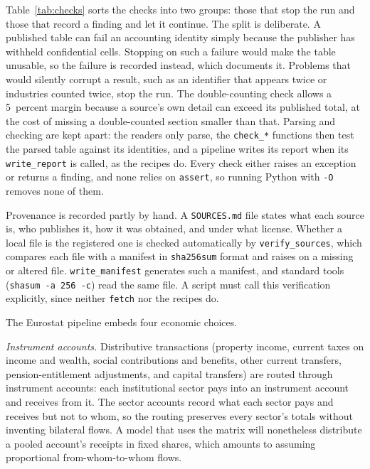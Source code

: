 \documentclass[11pt,a4paper]{article}
\begin{document}
Table~\ref{tab:checks} sorts the checks into two groups: those that stop
the run and those that record a finding and let it continue. The split is
deliberate. A published table can fail an accounting identity simply
because the publisher has withheld confidential cells. Stopping on such a
failure would make the table unusable, so the failure is recorded instead,
which documents it. Problems that would silently corrupt a result, such as
an identifier that appears twice or industries counted twice, stop the
run. The double-counting check allows a
5~percent margin because a source's own detail can exceed its published
total, at the cost of missing a double-counted section smaller than that.
Parsing and checking are kept apart: the readers only parse, the
\texttt{check\_*} functions then test the parsed table against its
identities, and a pipeline writes its report when its
\texttt{write\_report} is called, as the recipes do. Every check either
raises an exception or returns a finding, and none relies on
\texttt{assert}, so running Python with \texttt{-O} removes none of them.

Provenance is recorded partly by hand. A \texttt{SOURCES.md} file states
what each source is, who publishes it, how it was obtained, and under what
license. Whether a local file is the registered one is checked
automatically by \texttt{verify\_sources}, which compares each file with a
manifest in \texttt{sha256sum} format and raises on a missing or altered
file. \texttt{write\_manifest} generates such a manifest, and standard
tools (\texttt{shasum -a 256 -c}) read the same file. A script must call
this verification explicitly, since neither \texttt{fetch} nor the recipes
do.

The Eurostat pipeline embeds four economic choices.

\emph{Instrument accounts.} Distributive transactions (property income,
current taxes on income and wealth, social contributions and benefits,
other current transfers, pension-entitlement adjustments, and capital
transfers) are routed through instrument accounts: each institutional
sector pays into an instrument account and receives from it. The sector
accounts record what each sector pays and receives but not to whom, so the
routing preserves every sector's totals without inventing bilateral flows.
A model that uses the matrix will nonetheless distribute a pooled account's
receipts in fixed shares, which amounts to assuming proportional
from-whom-to-whom flows.
\end{document}
